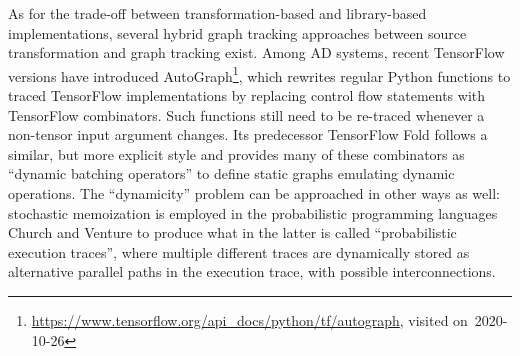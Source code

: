 As for the trade-off between transformation-based and library-based implementations, several hybrid
graph tracking approaches between source transformation and graph tracking exist.  Among AD systems,
recent TensorFlow versions have introduced
AutoGraph\footnote{\url{https://www.tensorflow.org/api_docs/python/tf/autograph}, visited
  on~2020-10-26}, which rewrites regular Python functions to traced TensorFlow implementations by
replacing control flow statements with TensorFlow combinators.  Such functions still need to be
re-traced whenever a non-tensor input argument changes.  Its predecessor TensorFlow Fold
\parencite{looks2017deep} follows a similar, but more explicit style and provides many of these
combinators as \enquote{dynamic batching operators} to define static graphs emulating dynamic
operations.  The \enquote{dynamicity} problem can be approached in other ways as well: stochastic
memoization is employed in the probabilistic programming languages Church
\parencite{goodman2012church} and Venture \parencite{mansinghka2014venture} to produce what in the
latter is called \enquote{probabilistic execution traces}, where multiple different traces are
dynamically stored as alternative parallel paths in the execution trace, with possible
interconnections.

